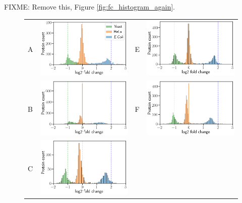 \documentclass[10pt,letterpaper]{article}
\begin{document}
FIXME: Remove this, Figure \ref{fig:fc_histogram_again}.

\begin{figure}[hbt]
    \centering
    \begin{tabular}{lclc} 
        A & \includegraphics[width=0.4\linewidth]{../../result/report_plots/osw_triqler_intensity.png} & 
        E & \includegraphics[width=0.4\linewidth]{../../result/report_plots/diann_triqler_intensity.png} \\ 
        B & \includegraphics[width=0.4\linewidth]{../../result/report_plots/osw_msqrobsum_intensity.png} & 
        F & \includegraphics[width=0.4\linewidth]{../../result/report_plots/diann_msqrobsum_intensity.png} \\ 
        C & \includegraphics[width=0.4\linewidth]{../../result/report_plots/osw_msstats_intensity.png} & 

\end{tabular}
\end{figure}
\end{document}
